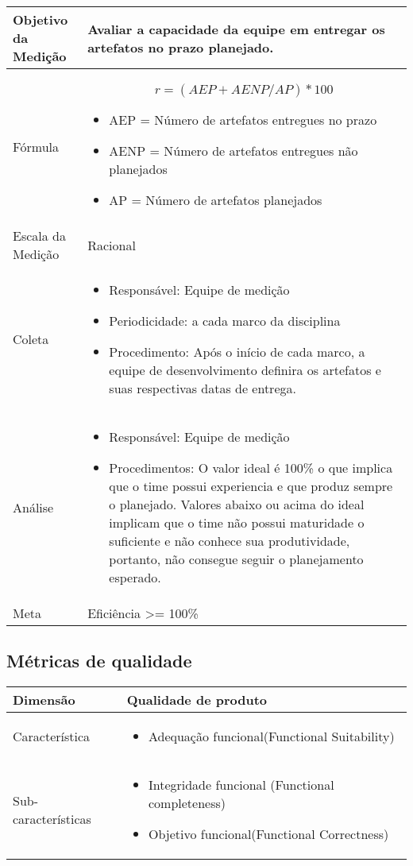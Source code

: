 	\begin{tabular}{ |p{4cm}|p{8cm}|  }
	 \hline
	 Objetivo da Medição 		&  	 Avaliar a capacidade da equipe em entregar os artefatos no prazo planejado.  \\ %
	 \hline
	 Fórmula		& 	 \[ r = (AEP + AENP / AP) * 100 \]	\begin{itemize} \item AEP = Número de artefatos entregues no prazo \item AENP = Número de artefatos entregues não planejados \item AP = Número de artefatos planejados\end{itemize}\\
	 \hline
	 Escala da Medição 		& 	Racional	 \\
	 \hline
	 Coleta		& 	\begin{itemize} \item Responsável: Equipe de medição \item Periodicidade: a cada marco da disciplina \item Procedimento: Após o início de cada marco, a equipe de desenvolvimento definira os artefatos e suas respectivas datas de entrega. \end{itemize}	\\
	 \hline
	 Análise		& 	\begin{itemize} \item Responsável: Equipe de medição \item Procedimentos: O valor ideal é 100\% o que implica que o time possui experiencia e que produz sempre o planejado. Valores abaixo ou acima do ideal implicam que o time não possui maturidade o suficiente e não conhece sua produtividade, portanto, não consegue seguir o planejamento esperado. \end{itemize} \\
	 \hline
	 Meta		& 	Eficiência >= 100\% 	 \\
	 \hline
	\end{tabular}

	\subsection{Métricas de qualidade}

	\begin{tabular}{ |p{4cm}|p{8cm}| }
		\hline
	   Dimensão 		& 	Qualidade de produto	 \\
	 \hline
	 Característica 		& 	\begin{itemize} \item Adequação funcional(Functional Suitability) \end{itemize}	 \\
	 \hline
	 Sub-características 		& 	\begin{itemize} \item Integridade funcional (Functional completeness) \item Objetivo funcional(Functional Correctness) \end{itemize} \\
	 \hline
	\end{tabular}


